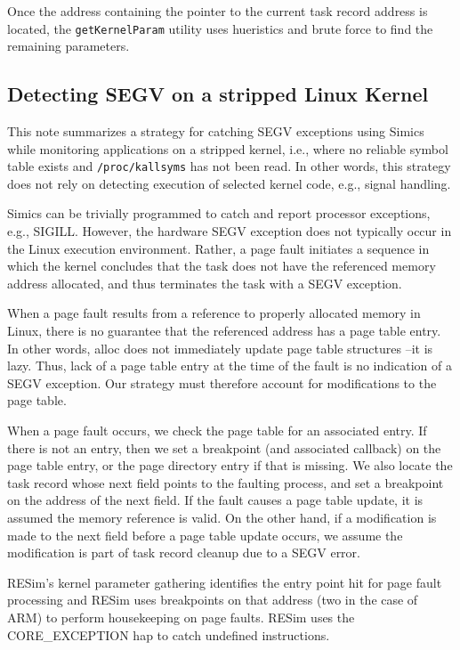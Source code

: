 \documentclass[titlepage]{article}
\begin{document}
\begin{appendices}
Once the address containing the pointer to the current task record address is located, the {\tt getKernelParam} utility uses hueristics and brute force to
find the remaining parameters.

\subsection{Detecting SEGV on a stripped Linux Kernel}
\label{SEGV}
This note summarizes a strategy for catching SEGV exceptions using Simics while monitoring applications on a stripped kernel, i.e., where no reliable symbol table exists and {\tt /proc/kallsyms} has not been read.  In other words, this strategy does not rely on detecting execution of selected kernel code, e.g., signal handling.

Simics can be trivially programmed to catch and report processor exceptions, e.g., SIGILL.  However, the hardware SEGV exception does not typically occur in the Linux execution environment.  Rather, a page fault initiates a sequence in which the kernel concludes that the task does not have the referenced memory address allocated, and thus terminates the task with a SEGV exception.

When a page fault results from a reference to properly allocated memory in Linux, there is no guarantee that the referenced address has a page table entry. In other words, alloc does not immediately update page table structures --it is lazy.  Thus, lack of a page table entry at the time of the fault is no indication of a SEGV exception.  Our strategy must therefore account for modifications to the page table.

When a page fault occurs, we check the page table for an associated entry. If there is not an entry, then we set a breakpoint (and associated callback) on the page table entry, or the page directory entry if that is missing.  We also locate the task record whose next field points to the faulting process, and set a breakpoint on the address of the next field.  If the fault causes a page table update, it is assumed the memory reference is valid.  On the other hand, if a modification is made to the next field before a page table update occurs, we assume the modification is part of task record cleanup due to a SEGV error.

RESim's kernel parameter gathering identifies the entry point hit for page fault processing and RESim uses breakpoints on that address (two in the case of ARM) to perform housekeeping on
page faults.  RESim uses the CORE\_EXCEPTION hap to catch undefined instructions.


\end{appendices}
\end{document}
